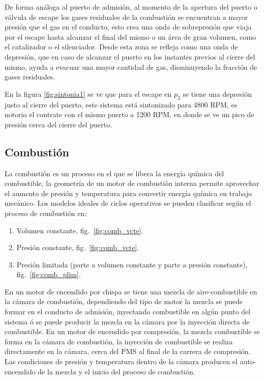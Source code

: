 De forma análoga al puerto de admisión, al momento de la apertura del puerto o
válvula de escape los gases residuales de la combustión se encuentran a  mayor
presión que el gas en el conducto, esto crea una onda de sobrepresión que viaja
por el escape hasta alcanzar el final del mismo o un área de gran volumen, como
el catalizador o el silenciador.
%
Desde esta zona se refleja como una onda de depresión, que en caso de alcanzar
el puerto en los instantes previos al cierre del mismo, ayuda a evacuar una
mayor cantidad de gas, disminuyendo la fracción de gases residuales.

En la figura \ref{fig:sintonia1} se ve que para el escape en $p_2$ se tiene una
depresión justo al cierre del puerto, este sistema está sintonizado para 4800
RPM, es notorio el contrate con el mismo puerto a 1200 RPM, en donde se ve un
pico de presión cerca del cierre del puerto.


\subsection{Combustión}
%
La combustión es un proceso en el que se libera la energía química del
combustible, la geometría de un motor de combustión interna permite aprovechar
el aumento de presión y temperatura para convertir energía química en trabajo
mecánico.
%
Los modelos ideales de ciclos operativos se pueden clasificar según el proceso
de combustión en:
%
\begin{enumerate}
    \item Volumen constante, fig.~\ref{fig:comb_vcte}.
    \item Presión constante, fig.~\ref{fig:comb_vcte}.
    \item Presión limitada (parte a volumen constante y parte a presión
constante), fig.~\ref{fig:comb_plim}.
\end{enumerate}

En un motor de encendido por chispa se tiene una mezcla de aire-combustible en
la cámara de combustión, dependiendo del tipo de motor la mezcla se puede formar
en el conducto de admisión, inyectando combustible en algún punto del sistema ó
se puede producir la mezcla en la cámara por la inyección directa de
combustible.
%
En un motor de encendido por compresión, la mezcla combustible se forma en la
cámara de combustión, la inyección de combustible se realiza directamente en la
cámara, cerca del PMS al final de la carrera de compresión.
%
Las condiciones de presión y temperatura dentro de la cámara producen el
auto-encendido de la mezcla y el inicio del proceso de combustión.

